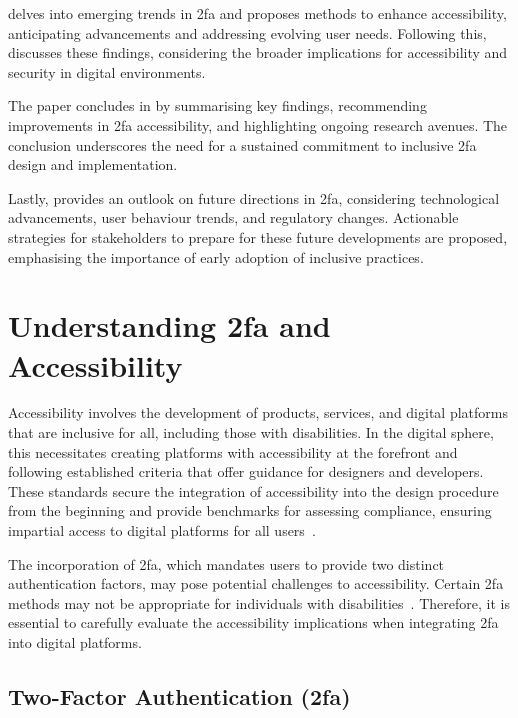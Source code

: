  delves into emerging trends in \ac{2fa} and proposes methods to enhance accessibility, anticipating advancements and addressing evolving user needs. Following this,  discusses these findings, considering the broader implications for accessibility and security in digital environments.

The paper concludes in  by summarising key findings, recommending improvements in \ac{2fa} accessibility, and highlighting ongoing research avenues. The conclusion underscores the need for a sustained commitment to inclusive \ac{2fa} design and implementation.

Lastly,  provides an outlook on future directions in \ac{2fa}, considering technological advancements, user behaviour trends, and regulatory changes. Actionable strategies for stakeholders to prepare for these future developments are proposed, emphasising the importance of early adoption of inclusive practices.

\section{Understanding \acs{2fa} and Accessibility}
\label{sec:understanding}

Accessibility involves the development of products, services, and digital platforms that are inclusive for all, including those with disabilities. In the digital sphere, this necessitates creating platforms with accessibility at the forefront and following established criteria that offer guidance for designers and developers. These standards secure the integration of accessibility into the design procedure from the beginning and provide benchmarks for assessing compliance, ensuring impartial access to digital platforms for all users~\cite{scullion_2021}.

The incorporation of \ac{2fa}, which mandates users to provide two distinct authentication factors, may pose potential challenges to accessibility. Certain \ac{2fa} methods may not be appropriate for individuals with disabilities~\cite{andrew_2023, jain_2019}. Therefore, it is essential to carefully evaluate the accessibility implications when integrating \ac{2fa} into digital platforms.

\subsection{Two-Factor Authentication (\acs{2fa})}
\label{sec:understanding:2fa}

